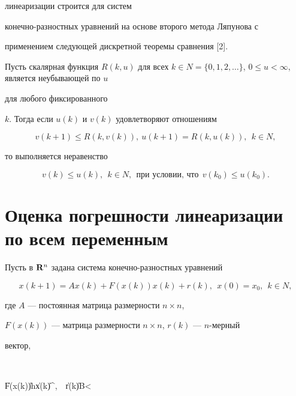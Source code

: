 линеаризации строится для систем


конечно-разностных уравнений на основе второго метода Ляпунова с


применением следующей дискретной теоремы сравнения [2].





\begin{thm}


Пусть скалярная функция $R(k,u)$ для всех $k\in N


=\{0,1,2,\dotsc\}$, $0\le u<\infty$, является неубывающей по $u$


для любого фиксированного


$k$. Тогда если $u(k)$ и $v(k)$ удовлетворяют отношениям


$$


v(k+1)\le R(k,v(k)),\ u(k+1)=R(k,u(k)),\ \ k\in N,


$$


то выполняется неравенство


$$


v(k)\le u(k),\ \ k\in N,\ \ \text{при условии, что}\ \ v(k_0)\le u(k_0).


$$


\end{thm}





\section{Оценка погрешности линеаризации по всем переменным}





Пусть в ${\bold R}^n$ задана система конечно-разностных уравнений


\begin{equation}


x(k+1)=Ax(k)+F(x(k))x(k)+r(k),\ \ x(0)=x_0,\ \ k\in N,


\end{equation}


где $A$ --- постоянная матрица размерности $n\times n$,


$F(x(k))$ --- матрица размерности $n\times n$, $r(k)$ --- $n$-мерный


вектор,


$$


\|F(x(k))\|\le h\|x(k)\|^{\gamma},\ \ \|r(k)\|\le B<\infty


